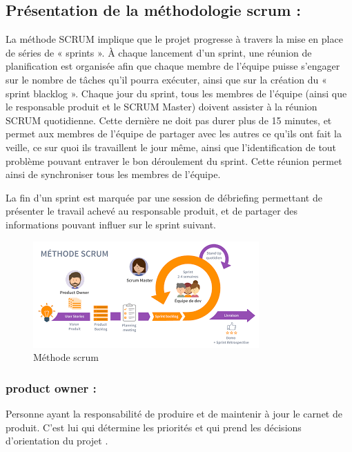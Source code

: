 	\subsection{Présentation de la méthodologie scrum :}
	La méthode SCRUM implique que le projet progresse à travers la mise en place de séries de « sprints ». À chaque lancement d’un sprint, une réunion de planification est organisée afin que chaque membre de l’équipe puisse s’engager sur le nombre de tâches qu’il pourra exécuter, ainsi que sur la création du « sprint blacklog ».
	Chaque jour du sprint, tous les membres de l’équipe (ainsi que le responsable produit et le SCRUM Master) doivent assister à la réunion SCRUM quotidienne. Cette dernière ne doit pas durer plus de 15 minutes, et permet aux membres de l’équipe de partager avec les autres ce qu’ils ont fait la veille, ce sur quoi ils travaillent le jour même, ainsi que l’identification de tout problème pouvant entraver le bon déroulement du sprint. Cette réunion permet ainsi de synchroniser tous les membres de l’équipe.
	\par
	La fin d’un sprint est marquée par une session de débriefing permettant de présenter le travail achevé au responsable produit, et de partager des informations pouvant influer sur le sprint suivant.
	\begin{figure} [h]
		\begin{center}
			\centering
			\includegraphics[width=1\linewidth]{Images/téléchargement (4)}
		\end{center}
		\caption{Méthode scrum}
	\end{figure}
	\subsubsection{product owner :}
	Personne ayant la responsabilité de produire et de maintenir à jour le carnet de produit. C'est lui qui détermine les priorités et qui prend les décisions d'orientation du projet .
